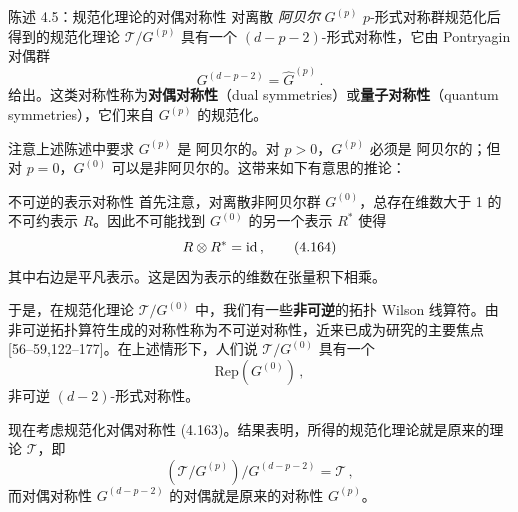 \begin{statementbox}{陈述 4.5：规范化理论的对偶对称性}
对离散 \emph{阿贝尔} $G^{(p)}$ $p$-形式对称群规范化后得到的规范化理论 $\mathcal{T}/G^{(p)}$ 具有一个 $(d-p-2)$-形式对称性，它由 Pontryagin 对偶群
\begin{equation}
G^{(d-p-2)}=\widehat{G}^{(p)}\,.
\tag{4.163}
\end{equation}
给出。这类对称性称为\textbf{对偶对称性}（dual symmetries）或\textbf{量子对称性}（quantum symmetries），它们来自 $G^{(p)}$ 的规范化。
\end{statementbox}

注意上述陈述中要求 $G^{(p)}$ 是 阿贝尔的。对 $p>0$，$G^{(p)}$ 必须是 阿贝尔的；但对 $p=0$，$G^{(0)}$ 可以是非阿贝尔的。这带来如下有意思的推论：

\begin{notebox}{不可逆的表示对称性}
首先注意，对离散非阿贝尔群 $G^{(0)}$，总存在维数大于 1 的不可约表示 $R$。因此不可能找到 $G^{(0)}$ 的另一个表示 $R^*$ 使得
\begin{equation}
R\otimes R^*=\mathrm{id}\,,
\tag{4.164}
\end{equation}
其中右边是平凡表示。这是因为表示的维数在张量积下相乘。

于是，在规范化理论 $\mathcal{T}/G^{(0)}$ 中，我们有一些\textbf{非可逆}的拓扑 Wilson 线算符。由非可逆拓扑算符生成的对称性称为不可逆对称性，近来已成为研究的主要焦点 [56--59,122--177]。在上述情形下，人们说 $\mathcal{T}/G^{(0)}$ 具有一个
\begin{equation}
\mathrm{Rep}(G^{(0)})\,,
\tag{4.165}
\end{equation}
非可逆 $(d-2)$-形式对称性。
\end{notebox}



现在考虑规范化对偶对称性 (4.163)。结果表明，所得的规范化理论就是原来的理论 $\mathcal{T}$，即
\begin{equation}
\left(\mathcal{T}/G^{(p)}\right)/G^{(d-p-2)}=\mathcal{T}\,,
\tag{4.166}
\end{equation}
而对偶对称性 $G^{(d-p-2)}$ 的对偶就是原来的对称性 $G^{(p)}$。

